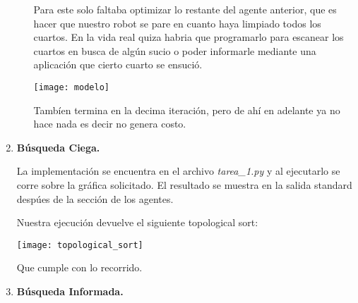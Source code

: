 \documentclass[14pt,letterpaper]{article}
\begin{document}
\begin{enumerate}
\begin{itemize}
      Para este solo faltaba optimizar lo restante del agente anterior,
      que es hacer que nuestro robot se pare en cuanto haya limpiado todos los cuartos.
      En la vida real quiza habria que programarlo para escanear los cuartos en busca de
      algún sucio o poder informarle mediante una aplicación que cierto cuarto
      se ensució.

      \begin{centering}
        \texttt{[image: modelo]}
      \end{centering}
      
      Tambíen termina en la decima iteración, pero de ahí en adelante ya no
      hace nada es decir no genera costo.
    \end{itemize}
    
  \item {\bf Búsqueda Ciega.}

    La implementación se encuentra en el archivo {\it tarea\_1.py} y al
    ejecutarlo se corre sobre la gráfica solicitado. El resultado se muestra
    en la salida standard despúes de la sección de los agentes.

    Nuestra ejecución devuelve el siguiente topological sort:

      \begin{centering}
        \texttt{[image: topological\_sort]}
      \end{centering}

      Que cumple con lo recorrido.
  \item {\bf Búsqueda Informada.}
  \end{enumerate}
\end{document}

